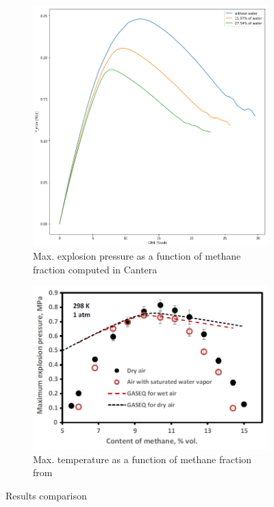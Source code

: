 \documentclass[a4paper]{article}
\begin{document}
\begin{figure}[H]
    \centering
    \begin{subfigure}[b]{0.4\textwidth}
        \includegraphics[width=\textwidth]{1_Pmax_to_CH4_2.png}
        	\caption{Max. explosion pressure as a function of methane fraction computed in Cantera}
        \label{fig:1_1a}
    \end{subfigure}
    \qquad
    \begin{subfigure}[b]{0.5\textwidth}
        \includegraphics[width=\textwidth]{f1_a2.png}
        	\caption{Max. temperature as a function of methane fraction from \cite{shen2016explosion}}
        \label{fig:1_1b}
    \end{subfigure}
    \caption{Results comparison}\label{fig:1}
\end{figure}
\end{document}
